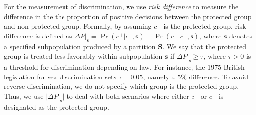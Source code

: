 \documentclass[twoside,leqno,twocolumn]{article}
\begin{document}
For the measurement of discrimination, we use \emph{risk difference} \cite{romei2014multidisciplinary} to measure the difference in the the proportion of positive decisions between the protected group and non-protected group. Formally, by assuming $c^{-}$ is the protected group, risk difference is defined as $\Delta P|_{\mathbf{s}} = \Pr(e^{+}|c^{+},\mathbf{s})-\Pr(e^{+}|c^{-},\mathbf{s})$, where $\mathbf{s}$ denotes a specified subpopulation produced by a partition $\mathbf{S}$. %
We say that the protected group is treated less favorably within subpopulation $\mathbf{s}$ if $\Delta P|_{\mathbf{s}} \geq \tau$, where $\tau>0$ is a threshold for discrimination depending on law. For instance, the 1975 British legislation for sex discrimination sets $\tau = 0.05$, namely a $5\%$ difference. To avoid reverse discrimination, we do not specify which group is the protected group. Thus, we use $|\Delta P|_{\mathbf{s}}|$ to deal with both scenarios where either $c^{-}$ or $c^{+}$ is designated as the protected group.

\end{document}
